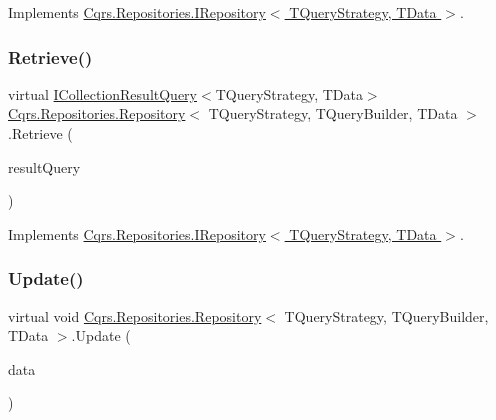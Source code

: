 Implements \hyperlink{interfaceCqrs_1_1Repositories_1_1IRepository_a65848508067b81e82da72af2063f2c07}{Cqrs.\+Repositories.\+I\+Repository$<$ T\+Query\+Strategy, T\+Data $>$}.

\mbox{\label{classCqrs_1_1Repositories_1_1Repository_ab1136a454f981848d49e0d0a2f4b6a2f}} 
\subsubsection{\texorpdfstring{Retrieve()}{Retrieve()}\hspace{0.1cm}{\footnotesize\ttfamily [2/2]}}
{\footnotesize\ttfamily virtual \hyperlink{interfaceCqrs_1_1Repositories_1_1Queries_1_1ICollectionResultQuery}{I\+Collection\+Result\+Query}$<$T\+Query\+Strategy, T\+Data$>$ \hyperlink{classCqrs_1_1Repositories_1_1Repository}{Cqrs.\+Repositories.\+Repository}$<$ T\+Query\+Strategy, T\+Query\+Builder, T\+Data $>$.Retrieve (\begin{DoxyParamCaption}\item[{\hyperlink{interfaceCqrs_1_1Repositories_1_1Queries_1_1ICollectionResultQuery}{I\+Collection\+Result\+Query}$<$ T\+Query\+Strategy, T\+Data $>$}]{result\+Query }\end{DoxyParamCaption})\hspace{0.3cm}{\ttfamily [virtual]}}



Implements \hyperlink{interfaceCqrs_1_1Repositories_1_1IRepository_a0faeb50aa395d63ccd81e66906360e81}{Cqrs.\+Repositories.\+I\+Repository$<$ T\+Query\+Strategy, T\+Data $>$}.

\mbox{\label{classCqrs_1_1Repositories_1_1Repository_a893276506e64034992d2c29d5ef11100}} 
\subsubsection{\texorpdfstring{Update()}{Update()}}
{\footnotesize\ttfamily virtual void \hyperlink{classCqrs_1_1Repositories_1_1Repository}{Cqrs.\+Repositories.\+Repository}$<$ T\+Query\+Strategy, T\+Query\+Builder, T\+Data $>$.Update (\begin{DoxyParamCaption}\item[{T\+Data}]{data }\end{DoxyParamCaption})\hspace{0.3cm}{\ttfamily [virtual]}}



